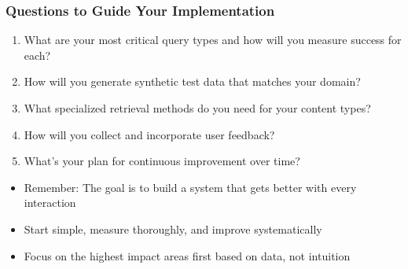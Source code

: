 {    \begin{frame}
        \frametitle{Questions to Guide Your Implementation}
        \begin{enumerate}
            \item What are your most critical query types and how will you measure success for each?
            \item How will you generate synthetic test data that matches your domain?
            \item What specialized retrieval methods do you need for your content types?
            \item How will you collect and incorporate user feedback?
            \item What's your plan for continuous improvement over time?
        \end{enumerate}
        \vspace{0.5cm}
        \begin{itemize}
            \item Remember: The goal is to build a system that gets better with every interaction
            \item Start simple, measure thoroughly, and improve systematically
            \item Focus on the highest impact areas first based on data, not intuition
        \end{itemize}
    \end{frame}

}
